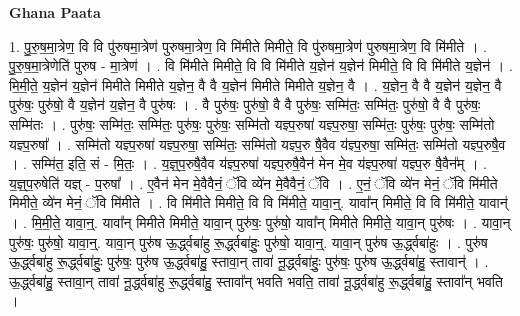 \documentclass[17pt]{extarticle}
\begin{document}
\textbf{Ghana Paata } \newline

1. पु॒रु॒ष॒मा॒त्रेण॒ वि वि पु॑रुषमा॒त्रेण॑ पुरुषमा॒त्रेण॒ वि मि॑मीते मिमीते॒ वि पु॑रुषमा॒त्रेण॑ पुरुषमा॒त्रेण॒ वि मि॑मीते । . पु॒रु॒ष॒मा॒त्रेणेति॑ पुरुष - मा॒त्रेण॑ । . वि मि॑मीते मिमीते॒ वि वि मि॑मीते य॒ज्ञेन॑ य॒ज्ञेन॑ मिमीते॒ वि वि मि॑मीते य॒ज्ञेन॑ । . मि॒मी॒ते॒ य॒ज्ञेन॑ य॒ज्ञेन॑ मिमीते मिमीते य॒ज्ञेन॒ वै वै य॒ज्ञेन॑ मिमीते मिमीते य॒ज्ञेन॒ वै । . य॒ज्ञेन॒ वै वै य॒ज्ञेन॑ य॒ज्ञेन॒ वै पुरु॑षः॒ पुरु॑षो॒ वै य॒ज्ञेन॑ य॒ज्ञेन॒ वै पुरु॑षः । . वै पुरु॑षः॒ पुरु॑षो॒ वै वै पुरु॑षः॒ सम्मि॑तः॒ सम्मि॑तः॒ पुरु॑षो॒ वै वै पुरु॑षः॒ सम्मि॑तः । . पुरु॑षः॒ सम्मि॑तः॒ सम्मि॑तः॒ पुरु॑षः॒ पुरु॑षः॒ सम्मि॑तो यज्ञ्प॒रुषा॑ यज्ञ्प॒रुषा॒ सम्मि॑तः॒ पुरु॑षः॒ पुरु॑षः॒ सम्मि॑तो यज्ञ्प॒रुषा᳚ । . सम्मि॑तो यज्ञ्प॒रुषा॑ यज्ञ्प॒रुषा॒ सम्मि॑तः॒ सम्मि॑तो यज्ञ्प॒रु षै॒वैव य॑ज्ञ्प॒रुषा॒ सम्मि॑तः॒ सम्मि॑तो यज्ञ्प॒रुषै॒व । . सम्मि॑त॒ इति॒ सं - मि॒तः॒ । . य॒ज्ञ्॒प॒रुषै॒वैव य॑ज्ञ्प॒रुषा॑ यज्ञ्प॒रुषै॒वैन॑ मेन मे॒व य॑ज्ञ्प॒रुषा॑ यज्ञ्प॒रु षै॒वैन᳚म् । . य॒ज्ञ्॒प॒रुषेति॑ यज्ञ् - प॒रुषा᳚ । . ए॒वैन॑ मेन मे॒वैवैनं॒ ॅवि व्ये॑न मे॒वैवैनं॒ ॅवि । . ए॒नं॒ ॅवि व्ये॑न मेनं॒ ॅवि मि॑मीते मिमीते॒ व्ये॑न मेनं॒ ॅवि मि॑मीते । . वि मि॑मीते मिमीते॒ वि वि मि॑मीते॒ यावा॒न्॒. यावा᳚न् मिमीते॒ वि वि मि॑मीते॒ यावान्॑ । . मि॒मी॒ते॒ यावा॒न्॒. यावा᳚न् मिमीते मिमीते॒ यावा॒न् पुरु॑षः॒ पुरु॑षो॒ यावा᳚न् मिमीते मिमीते॒ यावा॒न् पुरु॑षः । . यावा॒न् पुरु॑षः॒ पुरु॑षो॒ यावा॒न्॒. यावा॒न् पुरु॑ष ऊ॒र्द्ध्वबा॑हु रू॒र्द्ध्वबा॑हुः॒ पुरु॑षो॒ यावा॒न्॒. यावा॒न् पुरु॑ष ऊ॒र्द्ध्वबा॑हुः । . पुरु॑ष ऊ॒र्द्ध्वबा॑हु रू॒र्द्ध्वबा॑हुः॒ पुरु॑षः॒ पुरु॑ष ऊ॒र्द्ध्वबा॑हु॒ स्तावा॒न् तावा॑ नू॒र्द्ध्वबा॑हुः॒ पुरु॑षः॒ पुरु॑ष ऊ॒र्द्ध्वबा॑हु॒ स्तावान्॑ । . ऊ॒र्द्ध्वबा॑हु॒ स्तावा॒न् तावा॑ नू॒र्द्ध्वबा॑हु रू॒र्द्ध्वबा॑हु॒ स्तावा᳚न् भवति भवति॒ तावा॑ नू॒र्द्ध्वबा॑हु रू॒र्द्ध्वबा॑हु॒ स्तावा᳚न् भवति । \newline
\end{document}
